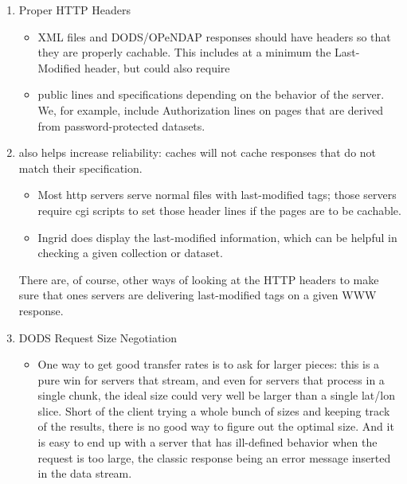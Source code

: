 \begin{enumerate}

  \item Proper HTTP Headers

    \begin{itemize} 
    \item XML files and DODS/OPeNDAP responses should have headers so
      that they are properly cachable. This includes at a minimum the
      Last-Modified header, but could also require
    \item {} public lines and  specifications
      depending on the behavior of the server. We, for example,
      include  Authorization lines on pages that are derived from
      password-protected datasets.
    \end{itemize}
    
  \item {} also helps increase reliability: caches
    will not cache responses that do not match their
     specification.

     \begin{itemize}
       
     \item Most http servers serve normal files with last-modified
       tags; those servers require cgi scripts to set those header
       lines if the pages are to be cachable.
       
     \item Ingrid does display the last-modified information, which
       can be helpful in checking a given collection or dataset.

     \end{itemize}

     There are, of course, other ways of looking at the HTTP headers
     to make sure that ones servers are delivering last-modified tags
     on a given WWW response.

  \item DODS Request Size Negotiation

     \begin{itemize}
       
     \item One way to get good transfer rates is to ask for larger
       pieces: this is a pure win for servers that stream, and even
       for servers that process in a single chunk, the ideal size
       could very well be larger than a single lat/lon slice. Short of
       the client trying a whole bunch of sizes and keeping track of
       the results, there is no good way to figure out the optimal
       size. And it is easy to end up with a server that has
       ill-defined behavior when the request is too large, the classic
       response being an error message inserted in the data stream.
       

\end{itemize}
\end{enumerate}
